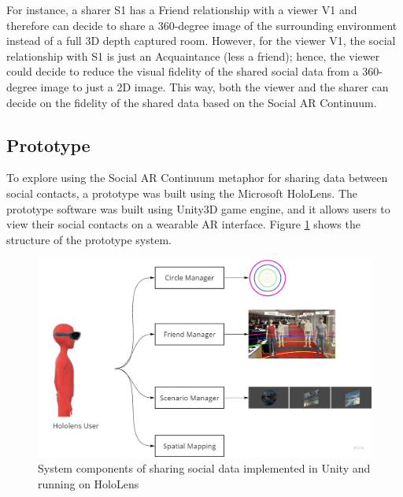 
For instance, a sharer S1 has a Friend relationship with a viewer V1 and therefore can decide to share a 360-degree image of the surrounding environment instead of a full 3D depth captured room. However, for the viewer V1, the social relationship with S1 is just an Acquaintance (less a friend); hence, the viewer could decide to reduce the visual fidelity of the shared social data from a 360-degree image to just a 2D image. This way, both the viewer and the sharer can decide on the fidelity of the shared data based on the Social AR Continuum.  


\subsection{Prototype}

To explore using the Social AR Continuum metaphor for sharing data between social contacts, a prototype was built using the Microsoft HoloLens. The prototype software was built using Unity3D game engine, and it allows users to view their social contacts on a wearable AR interface. Figure \ref{fig:data:system} shows the structure of the prototype system. 

\begin{figure}[ht]
    \centering
    \includegraphics[width=\linewidth]{images/chi/chi18-system.jpg}
    \caption{System components of sharing social data implemented in Unity and running on HoloLens}
    \label{fig:data:system}
\end{figure}

